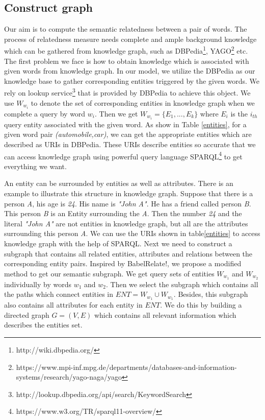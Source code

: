 \subsection{Construct graph}
\label{sec:construct graph}
Our aim is to compute the semantic relatedness between a pair of words. The process of relatedness measure
needs complete and ample background knowledge which can be gathered from knowledge graph, such as
DBPedia\footnote{http://wiki.dbpedia.org/}, 
YAGO\footnote{https://www.mpi-inf.mpg.de/departments/databases-and-information-systems/research/yago-naga/yago} etc.
The first problem we face is how to obtain knowledge which is associated with given words from knowledge graph. 
In our model, we utilize the DBPedia as our knowledge base to gather corresponding entities triggered by the given words.
We rely on lookup service\footnote{http://lookup.dbpedia.org/api/search/KeywordSearch} that is provided by DBPedia to achieve this object. 
We use $W_{w_i}$ to denote the set of corresponding entities in knowledge graph when we complete a query by word $w_i$.
Then we get $W_{w_i}=\{E_1,...,E_k\}$ where $E_i$ is the $i_{th}$ query entity associated with the given word.
As show in Table \ref{entities}, for a given word pair \emph{(automobile,car)}, 
we can get the appropriate entities which are described as URIs in DBPedia. 
These URIs describe entities so accurate that we can access knowledge graph using powerful
query language SPARQL\footnote{https://www.w3.org/TR/sparql11-overview/} to get everything we want.


An entity can be surrounded by entities as well as attributes. There is an example to illustrate this structure
in knowledge graph. Suppose that there is a person \emph{A}, his age is \emph{24}. His name is \emph{"John A"}.
He has a friend called person \emph{B}. This person \emph{B} is an Entity surrounding the \emph{A}.
Then the number \emph{24} and the literal \emph{"John A"} are not entities in knowledge graph,
but all are the attributes surrounding this person \emph{A}.
We can use the URIs shown in table\ref{entities} to access knowledge graph with the help of SPARQL. Next we need to construct a subgraph 
that contains all related entities, attributes and relations between the corresponding entity pairs. Inspired by BabelRelate!\cite{aaai/NavigliP12},
we propose a modified method to get our semantic subgraph. We get query sets of entities $W_{w_1}$ and $W_{w_2}$ individually
by words $w_1$ and $w_2$. Then we select the subgraph which contains all the paths which connect entities in
$ENT = W_{w_1} \cup W_{w_1}$. Besides, this subgraph also contains all attributes for each entity in $ENT$. We do 
this by building a directed graph ${G = (V, E)}$ which contains all relevant information which describes
the entities set.

